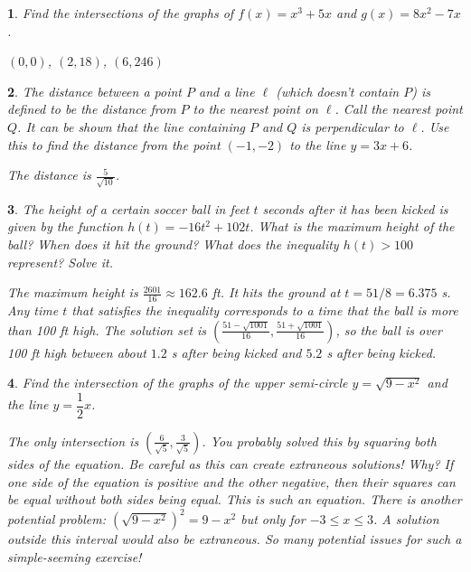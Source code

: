 \documentclass{amsbook}
\newtheorem{exc}{}
\newenvironment{ex}{\begin{exc}\normalfont}{\end{exc}}
\numberwithin{section}{chapter}
\numberwithin{equation}{chapter}
\begin{document}
\begin{ex}
	Find the intersections of the graphs of $f(x) = x^3+5x$ and $g(x) = 8x^2-7x$.
	\begin{sol}
		$(0,0)$, $(2, 18)$, $(6, 246)$
	\end{sol}
\end{ex}

\begin{ex}
	The distance between a point $P$ and a line $\ell$ (which doesn't contain $P$) is defined to be the distance from $P$ to the nearest point on $\ell$. Call the nearest point $Q$. It can be shown that the line containing $P$ and $Q$ is perpendicular to $\ell$. Use this  to find the distance from the point $(-1,-2)$ to the line $y=3x+6$.
	\begin{sol}
		The distance is $\frac{5}{\sqrt{10}}$.
	\end{sol}
\end{ex}

\begin{ex}
	The height of a certain soccer ball in feet $t$ seconds after it has been kicked is given by the function $h(t) = -16t^2+102t$. What is the maximum height of the ball? When does it hit the ground? What does the inequality $h(t) > 100$ represent? Solve it.
	\begin{sol}
		The maximum height is $\frac{2601}{16} \approx 162.6$ ft. It hits the ground at $t = 51/8 =6.375$ s. Any time $t$ that satisfies the inequality corresponds to a time that the ball is more than 100 ft high. The solution set is $\left(\frac{51-\sqrt{1001}}{16}, \frac{51+\sqrt{1001}}{16} \right)$, so the ball is over 100 ft high between about $1.2$ s after being kicked and $5.2$ s after being kicked.
	\end{sol}
\end{ex}

\begin{ex}
	Find the intersection of the graphs of the upper semi-circle $y = \sqrt{9-x^2}$ and the line $y = \dfrac{1}{2}x$.
	
	\begin{sol}
		The only intersection is $\left( \frac{6}{\sqrt{5}}, \frac{3}{\sqrt{5}} \right)$. You probably solved this by squaring both sides of the equation. Be careful as this can create extraneous solutions! Why? If one side of the equation is positive and the other negative, then their squares can be equal without both sides being equal. This is such an equation. There is another potential problem: $(\sqrt{9-x^2})^2 = 9-x^2$ but only for $-3 \leq x \leq 3$. A solution outside this interval would also be extraneous. So many potential issues for such a simple-seeming exercise!
	\end{sol}
\end{ex}
\end{document}
